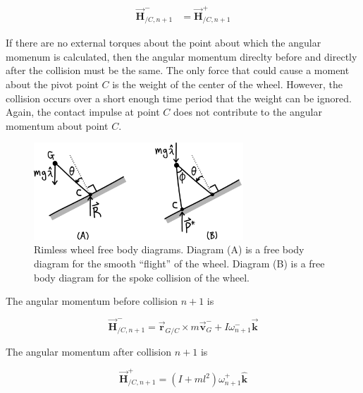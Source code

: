 \begin{align}
\vec{\mathbf{H}}_{/C,n+1}^{-} &= \vec{\mathbf{H}}_{/C,n+1}^{+}
\label{eq:RimlessAM}
\end{align}

If there are no external torques about the point about which the angular momenum is calculated, then the angular momentum direclty before and directly after the collision must be the same. The only force that could cause a moment about the pivot point $C$ is the weight of the center of the wheel. However, the collision occurs over a short enough time period that the weight can be ignored. Again, the contact impulse at point $C$ does not contribute to the angular momentum about point $C$.

\begin{figure}[h]		%
\begin{centering}
\includegraphics[width=0.7\textwidth]{Figures/RimlessSmoothAndCollision}\par
\end{centering}
\caption[Diagram: Rimless Wheel Free Body Diagrams]{Rimless wheel free body diagrams. Diagram (A) is a free body diagram for the smooth ``flight'' of the wheel. Diagram (B) is a free body diagram for the spoke collision of the wheel.}
\label{fig:RimlessSmoothAndCollision}
\end{figure}
%

The angular momentum before collision $n+1$ is

\begin{equation}
\vec{\mathbf{H}}_{/C,n+1}^{-} = \vec{\mathbf{r}}_{G/C} \times m\vec{\mathbf{v}}_{G}^{-} + I \omega_{n+1}^{-} \vec{\mathbf{k}}
\label{eq:RimlessHMinus}
\end{equation}

The angular momentum after collision $n+1$ is

\begin{equation}
\vec{\mathbf{H}}_{/C,n+1}^{+} = (I + ml^{2} ) \omega_{n+1}^{+} \hat{\mathbf{k}}
\label{eq:RimlessHPlus}
\end{equation}

